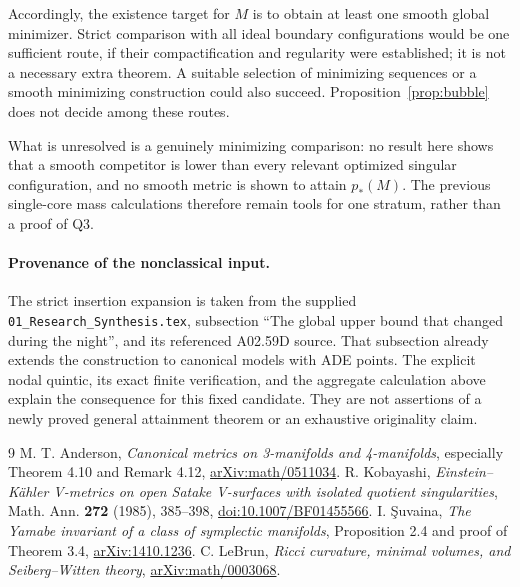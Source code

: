 \documentclass[11pt]{article}
\begin{document}
Accordingly, the existence target for $M$ is to obtain at least one smooth
global minimizer. Strict comparison with all ideal boundary configurations
would be one sufficient route, if their compactification and regularity
were established; it is not a necessary extra theorem. A suitable selection
of minimizing sequences or a smooth minimizing construction could also
succeed. Proposition~\ref{prop:bubble} does not decide among these routes.

What is unresolved is a genuinely minimizing comparison: no result here
shows that a smooth competitor is lower than every relevant optimized
singular configuration, and no smooth metric is shown to attain $p_*(M)$.
The previous single-core mass calculations therefore remain tools for one
stratum, rather than a proof of Q3.

\paragraph{Provenance of the nonclassical input.}
The strict insertion expansion is taken from the supplied
\texttt{01\_Research\_Synthesis.tex}, subsection ``The global upper bound
that changed during the night'', and its referenced A02.59D source.
That subsection already extends the construction to canonical models
with ADE points. The explicit nodal quintic, its exact finite verification,
and the aggregate calculation above explain the consequence for this fixed
candidate. They are not assertions of a newly proved general attainment
theorem or an exhaustive originality claim.

\begin{thebibliography}{9}
 M. T. Anderson, \emph{Canonical metrics on
3-manifolds and 4-manifolds}, especially Theorem 4.10 and Remark 4.12,
\href{https://arxiv.org/abs/math/0511034}{arXiv:math/0511034}.
 R. Kobayashi, \emph{Einstein--K\"ahler V-metrics on
open Satake V-surfaces with isolated quotient singularities},
Math. Ann. \textbf{272} (1985), 385--398,
\href{https://doi.org/10.1007/BF01455566}{doi:10.1007/BF01455566}.
 I. \c Suvaina, \emph{The Yamabe invariant of a class
of symplectic manifolds}, Proposition 2.4 and proof of Theorem 3.4,
\href{https://arxiv.org/abs/1410.1236}{arXiv:1410.1236}.
 C. LeBrun, \emph{Ricci curvature, minimal volumes,
and Seiberg--Witten theory},
\href{https://arxiv.org/abs/math/0003068}{arXiv:math/0003068}.
\end{thebibliography}
\end{document}
